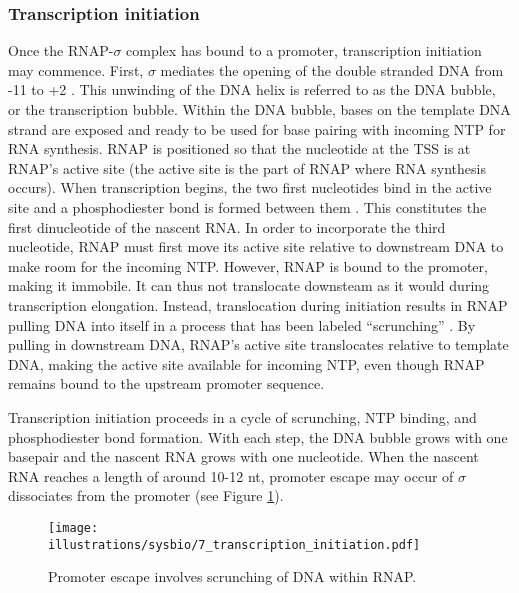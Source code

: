 \subsubsection{Transcription initiation}
Once the RNAP-$\sigma$ complex has bound to a promoter, transcription
initiation may commence. First, $\sigma$ mediates the opening of the double
stranded DNA from -11 to +2 \cite{borukhov_rna_2008}. This unwinding of the DNA
helix is referred to as the DNA bubble, or the transcription bubble. Within the
DNA bubble, bases on the template DNA strand are exposed and ready to be used
for base pairing with incoming NTP for RNA synthesis. RNAP is positioned so
that the nucleotide at the TSS is at RNAP's active site (the active site is the
part of RNAP where RNA synthesis occurs). When transcription begins, the two
first nucleotides bind in the active site and a phosphodiester bond is formed
between them \cite{mcclure_steady_1978}. This constitutes the first
dinucleotide of the nascent RNA. In order to incorporate the third nucleotide,
RNAP must first move its active site relative to downstream DNA to make room
for the incoming NTP. However, RNAP is bound to the promoter, making it
immobile. It can thus not translocate downsteam as it would during
transcription elongation. Instead, translocation during initiation results in
RNAP pulling DNA into itself in a process that has been labeled ``scrunching''
\cite{kapanidis_initial_2006, revyakin_abortive_2006}. By pulling in downstream
DNA, RNAP's active site translocates relative to template DNA, making the
active site available for incoming NTP, even though RNAP remains bound to the
upstream promoter sequence.

Transcription initiation proceeds in a cycle of scrunching, NTP binding, and
phosphodiester bond formation. With each step, the DNA bubble grows with one
basepair and the nascent RNA grows with one nucleotide. When the nascent RNA
reaches a length of around 10-12 nt, promoter escape may occur of $\sigma$
dissociates from the promoter \cite{lilian_m_promoter_2002} (see
Figure \ref{fig:simple_escape}).

\begin{figure}[htb]
	\begin{center}
		\texttt{[image: illustrations/sysbio/7\_transcription\_initiation.pdf]}
	\end{center}
	\caption{Promoter escape involves scrunching of DNA within RNAP.}
	\label{fig:simple_escape}
\end{figure}

